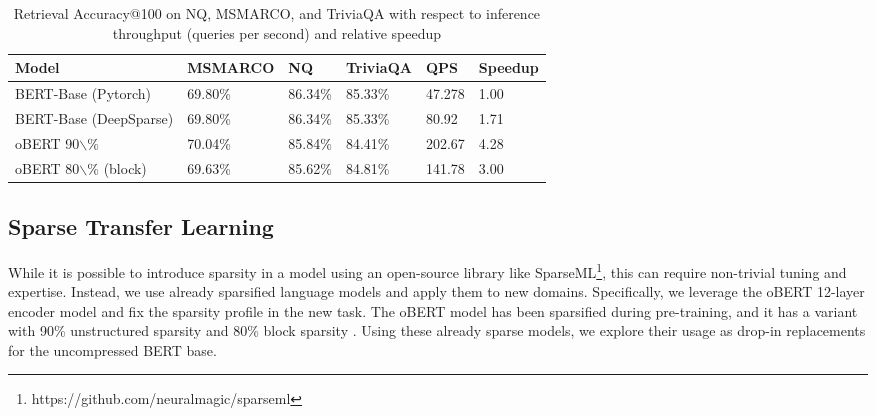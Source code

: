 \documentclass[11pt]{article}
\begin{document}
\begin{table*}[htb!]
    \centering
    \caption{Retrieval Accuracy@100 on NQ, MSMARCO, and TriviaQA with respect to inference throughput (queries per second) and relative speedup}
    \begin{tabular}{|l|l|l|l|l|l|}
    \hline
        Model & MSMARCO & NQ & TriviaQA  & QPS & Speedup \\ \hline
        BERT-Base (Pytorch) & 69.80\% & 86.34\% & 85.33\% & 47.278 & 1.00 \\ \hline
        BERT-Base (DeepSparse) & 69.80\% & 86.34\% & 85.33\% & 80.92 & 1.71 \\ \hline
        oBERT 90$\backslash$\% & 70.04\% & 85.84\% & 84.41\% & 202.67 & 4.28  \\ \hline
        oBERT 80$\backslash$\% (block) & 69.63\% & 85.62\% & 84.81\%  & 141.78 & 3.00 \\ \hline
    \end{tabular}
    \label{tab:sum-dense-sparse}
\end{table*}
\subsection{Sparse Transfer Learning}
While it is possible to introduce sparsity in a model using an open-source library like SparseML\footnote{https://github.com/neuralmagic/sparseml}, this can require non-trivial tuning and expertise. Instead, we use already sparsified language models and apply them to new domains. Specifically, we leverage the oBERT 12-layer encoder model \cite{Kurti2022TheOB} and fix the sparsity profile in the new task. The oBERT model has been sparsified during pre-training, and it has a variant with 90\% unstructured sparsity and 80\% block sparsity \cite{Eldar2008BlocksparsityCA}. Using these already sparse models, we explore their usage as drop-in replacements for the uncompressed BERT base.\
\end{document}
